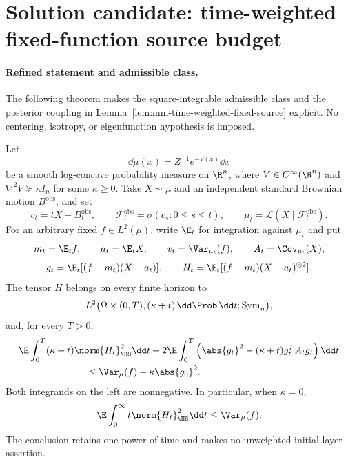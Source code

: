 \documentclass[../main.tex]{subfiles}
\begin{document}
%
\section*{Solution candidate: time-weighted fixed-function source budget}
\label{sec:sol-lem-mm-time-weighted-fixed-source}

\paragraph{Refined statement and admissible class.}
The following theorem makes the square-integrable admissible class and the posterior coupling
in Lemma~\ref{lem:mm-time-weighted-fixed-source} explicit.  No centering, isotropy, or
eigenfunction hypothesis is imposed.

\begin{theorem}[= Lemma~\ref{lem:mm-time-weighted-fixed-source}]
\label{thm:sol-lem-mm-time-weighted-fixed-source}
Let
\[
  \dd\mu(x)=Z^{-1}e^{-V(x)}\dd x
\]
be a smooth log-concave probability measure on $\R^n$, where $V\in C^\infty(\R^n)$ and
$\nabla^2V\succeq\kappa I_n$ for some $\kappa\ge0$.  Take $X\sim\mu$ and an independent
standard Brownian motion $B^{\mathrm{obs}}$, and set
\[
  c_t=tX+B_t^{\mathrm{obs}},
  \qquad
  \mathcal F_t^{\mathrm{obs}}=\sigma(c_s:0\le s\le t),
  \qquad
  \mu_t=\mathcal L(X\mid\mathcal F_t^{\mathrm{obs}}).
\]
For an arbitrary fixed $f\in L^2(\mu)$, write $\E_t$ for integration against $\mu_t$ and put
\[
  m_t=\E_tf,
  \qquad a_t=\E_tX,
  \qquad v_t=\Var_{\mu_t}(f),
  \qquad A_t=\Cov_{\mu_t}(X),
\]
\[
  g_t=\E_t[(f-m_t)(X-a_t)],
  \qquad
  H_t=\E_t[(f-m_t)(X-a_t)^{\otimes2}].
\]
The tensor $H$ belongs on every finite horizon to
\[
  L^2\bigl(\Omega\times(0,T),(\kappa+t)\,\dd\Prob\,\dd t;
             \operatorname{Sym}_n\bigr),
\]
and, for every $T>0$,
\begin{align}
 &\E\int_0^T(\kappa+t)\norm{H_t}_{\HS}^2\dd t
 +2\E\int_0^T\left(\abs{g_t}^2-(\kappa+t)g_t^TA_tg_t\right)\dd t \notag\\
 &\hspace{7em}\le \Var_\mu(f)-\kappa\abs{g_0}^2.
 \label{eq:sol-mm-time-weighted-fixed-source}
\end{align}
Both integrands on the left are nonnegative.  In particular, when $\kappa=0$,
\begin{equation}
  \E\int_0^\infty t\norm{H_t}_{\HS}^2\dd t\le\Var_\mu(f).
  \label{eq:sol-mm-time-weighted-infinite}
\end{equation}
The conclusion retains one power of time and makes no unweighted initial-layer assertion.
\end{theorem}
\end{document}
